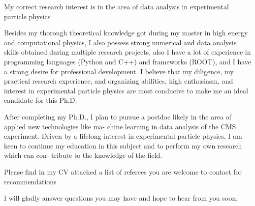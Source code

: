 \begin{cvletter}
My correct research interest is in the area of data analysis in experimental particle physics
% 
% 
% 
% 
% 

Besides my thorough theoretical knowledge got during my master in high energy and computational physics, I also possess strong numerical and data analysis skills obtained during multiple research projects, also I have a lot of experience in programming languages (Python and C++) and frameworks (ROOT), and I have a strong desire for professional development. I believe that my diligence, my practical research experience, and organizing abilities, high enthusiasm, and interest in experimental particle physics are most conducive to make me an ideal candidate for this Ph.D.

After completing my Ph.D., I plan to pursue a postdoc likely in the area of applied new technologies like ma- chine learning in data analysis of the CMS experiment. Driven by a lifelong interest in experimental particle physics, I am keen to continue my education in this subject and to perform my own research which can con- tribute to the knowledge of the field.

Please find in my CV attached a list of referees you are welcome to contact for recommendations

I will gladly answer questions you may have and hope to hear from you soon.


\end{cvletter}


\makeletterclosing


